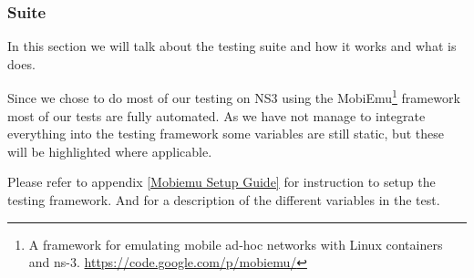 \subsubsection{Suite}\label{Testing:About:Suite}
	In this section we will talk about the testing suite and how it works and what is does.
	
	Since we chose to do most of our testing on NS3 using the MobiEmu\footnote{A framework for emulating mobile ad-hoc networks with Linux containers and ns-3. \url{https://code.google.com/p/mobiemu/}} framework most of our tests are fully automated. As we have not manage to integrate everything into the testing framework some variables are still static, but these will be highlighted where applicable.

	\begin{shaded}
	Please refer to appendix \ref{Mobiemu Setup Guide} for instruction to setup the testing framework. And for a description of the different variables in the test.
	\end{shaded}
